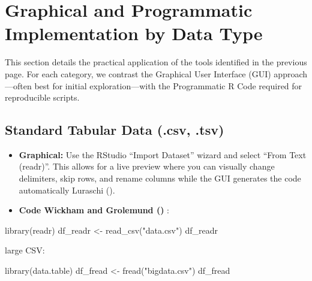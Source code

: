 \documentclass[
  doc,
  longtable,
  a4paper,
  nolmodern,
  notxfonts,
  notimes,
  colorlinks=true,linkcolor=blue,citecolor=blue,urlcolor=blue]{apa7}
\newenvironment{Shaded}{\begin{snugshade}}{\end{snugshade}}
\newcommand{\FunctionTok}[1]{\textcolor[rgb]{0.28,0.35,0.67}{#1}}
\newcommand{\NormalTok}[1]{\textcolor[rgb]{0.00,0.23,0.31}{#1}}
\newcommand{\OtherTok}[1]{\textcolor[rgb]{0.00,0.23,0.31}{#1}}
\newcommand{\StringTok}[1]{\textcolor[rgb]{0.13,0.47,0.30}{#1}}
\begin{document}
\begin{table}
\end{table}

\section{Graphical and Programmatic Implementation by Data
Type}\label{graphical-and-programmatic-implementation-by-data-type}

This section details the practical application of the tools identified
in the previous page. For each category, we contrast the Graphical User
Interface (GUI) approach---often best for initial exploration---with the
Programmatic R Code required for reproducible scripts.

\subsection{Standard Tabular Data (.csv,
.tsv)}\label{standard-tabular-data-.csv-.tsv}

\begin{itemize}
\item
  \textbf{Graphical:} Use the RStudio ``Import Dataset'' wizard and
  select ``From Text (readr)''. This allows for a live preview where you
  can visually change delimiters, skip rows, and rename columns while
  the GUI generates the code automatically Luraschi
  ().
\item
  \textbf{Code Wickham and Grolemund
  ()} :
\end{itemize}

\begin{Shaded}
\begin{Highlighting}[]
\FunctionTok{library}\NormalTok{(readr)}
\NormalTok{df\_readr }\OtherTok{\textless{}{-}} \FunctionTok{read\_csv}\NormalTok{(}\StringTok{"data.csv"}\NormalTok{)}
\NormalTok{df\_readr}
\end{Highlighting}
\end{Shaded}

large CSV:

\begin{Shaded}
\begin{Highlighting}[]
\FunctionTok{library}\NormalTok{(data.table)}
\NormalTok{df\_fread }\OtherTok{\textless{}{-}} \FunctionTok{fread}\NormalTok{(}\StringTok{"bigdata.csv"}\NormalTok{)}
\NormalTok{df\_fread}
\end{Highlighting}
\end{Shaded}
\end{document}
